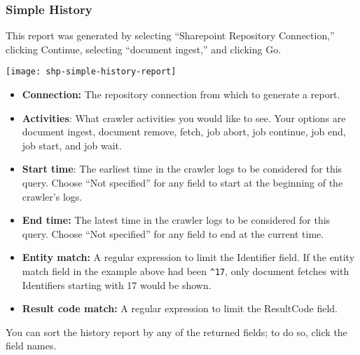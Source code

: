 \begin{changemargin}{1.5in}{0in}
\subsubsection{Simple History}

This report was generated by selecting ``Sharepoint Repository Connection,'' 
clicking Continue, selecting ``document ingest,'' and clicking Go.

\texttt{[image: shp-simple-history-report]}

\begin{itemize}

\item \textbf{Connection:} The repository connection from which to generate
a report.

\item \textbf{Activities}: What crawler activities you would like to
see.  Your options are document ingest, document remove, fetch, job
abort, job continue, job end, job start, and job wait.

\item \textbf{Start time}: The earliest time in the crawler logs to be
considered for this query.  Choose ``Not specified'' for any field to
start at the beginning of the crawler's logs.

\item \textbf{End time:} The latest time in the crawler logs to be
considered for this query. Choose ``Not specified'' for any field 
to end at the current time.

\item \textbf{Entity match:} A regular expression to limit the
Identifier field. If the entity match field in the example above had
been \texttt{\^{}17}, only document fetches with Identifiers starting
with 17 would be shown.

\item \textbf{Result code match:} A regular expression to limit the
ResultCode field.

\end{itemize}

You can sort the history report by any of the returned fields; to do so,
click the field names.



\end{changemargin}
